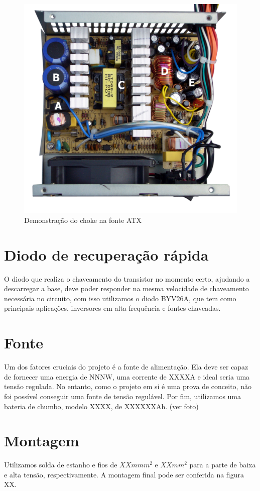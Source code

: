 \begin{figure}[htb]
\caption{\label{fig_fonte-atx}Demonstração do choke na fonte ATX}
\begin{center}
\includegraphics[scale=0.5]{images/fonte-atx.png}
\end{center}
\end{figure}


\section{Diodo de recuperação rápida}
O diodo que realiza o chaveamento do transistor no momento certo, ajudando a descarregar a base, deve poder responder na mesma velocidade de chaveamento necessária no circuito, com isso utilizamos o diodo BYV26A, que tem como principais aplicações, inversores em alta frequência e fontes chaveadas.
\section{Fonte}
Um dos fatores cruciais do projeto é a fonte de alimentação. Ela deve ser capaz de fornecer uma energia de NNNW, uma corrente de XXXXA e ideal seria uma tensão regulada. No entanto, como o projeto em si é uma prova de conceito, não foi possível conseguir uma fonte de tensão regulável. Por fim, utilizamos uma bateria de chumbo, modelo XXXX, de XXXXXXAh. (ver foto)
\section{Montagem}
Utilizamos solda de estanho e fios de $XXmmm^2$ e $XXmm^2$ para a parte de baixa e alta tensão, respectivamente. A montagem final pode ser conferida na figura XX.